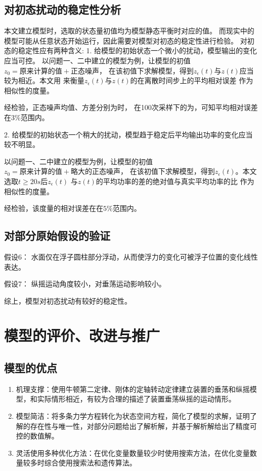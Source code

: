 \documentclass[withoutpreface,bwprint]{cumcmthesis} %
\begin{document}
    \subsection{对初态扰动的稳定性分析}
    本文建立模型时，选取的状态量初值均为模型静态平衡时对应的值。
    而现实中的模型可能从任意状态开始运行，因此需要对模型对初态的稳定性进行检验。
    对初态的稳定性应有两种含义:
    1. 给模型的初始状态一个微小的扰动，模型输出的变化应当可控。
       以问题一、二中建立的模型为例，让模型的初值$ z_0 = 原来计算的值 + 正态噪声 $，
       在该初值下求解模型，得到$ z_{\epsilon}(t) $与$ z(t) $应当较为相近。本文用
        $ $来衡量$ z_{\epsilon}(t) $与$ z(t) $的在离散时间步上的平均相对误差
       作为相似性的度量。

       经检验，正态噪声均值、方差分别为$ $时， 在100次采样下的$ $为$ $，可知平均相对误差在$3\%$范围内。

    2. 给模型的初始状态一个稍大的扰动，模型趋于稳定后平均输出功率的变化应当较不明显。
        
        以问题一、二中建立的模型为例，让模型的初值$ z_0 = 原来计算的值 + 略大的正态噪声 $，
        在该初值下求解模型，得到$ z_{\epsilon}(t) $。本文选取$ t \geq 20s $后$ z_{\epsilon}(t) $
        与$ z(t) $的$ 平均功率的差的绝对值与真实平均功率的比 $ 作为相似性的度量。
        
        经检验，该度量的相对误差在在$5\%$范围内。

    \subsection{对部分原始假设的验证}
    假设6： 水面仅在浮子圆柱部分浮动，从而使浮力的变化可被浮子位置的变化线性表达。

    假设7： 纵摇运动角度较小，对垂荡运动影响较小。
    
     
    综上，模型对初态扰动有较好的稳定性。
    \section{模型的评价、改进与推广}
    \subsection{模型的优点}
    \begin{enumerate}
        \item 机理支撑：使用牛顿第二定律、刚体的定轴转动定律建立装置的垂荡和纵摇模型，和实际情形相近，有较为合理的描述了装置垂荡纵摇的运动情形。
        \item 模型简洁：将多条力学方程转化为状态空间方程，简化了模型的求解，证明了解的存在性与唯一性，对部分问题给出了解析解，并基于解析解给出了精度可控的数值解。
        \item 灵活使用多种优化方法：在优化变量数量较少时使用搜索方法，在优化变量数量较多时综合使用搜索法和遗传算法。
    \end{enumerate}
\end{document}
